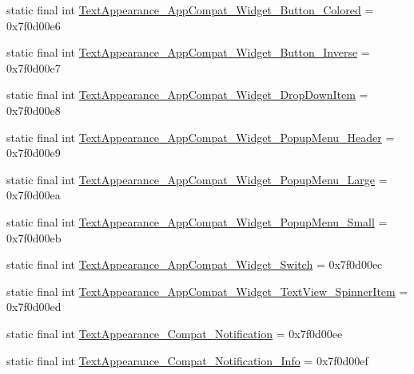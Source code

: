 \begin{DoxyCompactItemize}
\item 
static final int \mbox{\hyperlink{classcom_1_1synnapps_1_1carouselview_1_1_r_1_1style_acfe36648cf7ea21cec908f643bfdeacb}{Text\+Appearance\+\_\+\+App\+Compat\+\_\+\+Widget\+\_\+\+Button\+\_\+\+Colored}} = 0x7f0d00e6
\item 
static final int \mbox{\hyperlink{classcom_1_1synnapps_1_1carouselview_1_1_r_1_1style_ade4705e633d2a9732bae7459c625e06c}{Text\+Appearance\+\_\+\+App\+Compat\+\_\+\+Widget\+\_\+\+Button\+\_\+\+Inverse}} = 0x7f0d00e7
\item 
static final int \mbox{\hyperlink{classcom_1_1synnapps_1_1carouselview_1_1_r_1_1style_a25ecba49f37a4b5fc9a7170acc55ebff}{Text\+Appearance\+\_\+\+App\+Compat\+\_\+\+Widget\+\_\+\+Drop\+Down\+Item}} = 0x7f0d00e8
\item 
static final int \mbox{\hyperlink{classcom_1_1synnapps_1_1carouselview_1_1_r_1_1style_a74ef552da152bf0e4701b67322d65aa7}{Text\+Appearance\+\_\+\+App\+Compat\+\_\+\+Widget\+\_\+\+Popup\+Menu\+\_\+\+Header}} = 0x7f0d00e9
\item 
static final int \mbox{\hyperlink{classcom_1_1synnapps_1_1carouselview_1_1_r_1_1style_aaa323f414aac71ab5d3b9e0200a6930e}{Text\+Appearance\+\_\+\+App\+Compat\+\_\+\+Widget\+\_\+\+Popup\+Menu\+\_\+\+Large}} = 0x7f0d00ea
\item 
static final int \mbox{\hyperlink{classcom_1_1synnapps_1_1carouselview_1_1_r_1_1style_ab6cbaec05cbf04a4df4edc4cce1bc2fe}{Text\+Appearance\+\_\+\+App\+Compat\+\_\+\+Widget\+\_\+\+Popup\+Menu\+\_\+\+Small}} = 0x7f0d00eb
\item 
static final int \mbox{\hyperlink{classcom_1_1synnapps_1_1carouselview_1_1_r_1_1style_a41463c0771dab9df85994631eeeb91ed}{Text\+Appearance\+\_\+\+App\+Compat\+\_\+\+Widget\+\_\+\+Switch}} = 0x7f0d00ec
\item 
static final int \mbox{\hyperlink{classcom_1_1synnapps_1_1carouselview_1_1_r_1_1style_a947ba58ca78dbddb668314fe423282f2}{Text\+Appearance\+\_\+\+App\+Compat\+\_\+\+Widget\+\_\+\+Text\+View\+\_\+\+Spinner\+Item}} = 0x7f0d00ed
\item 
static final int \mbox{\hyperlink{classcom_1_1synnapps_1_1carouselview_1_1_r_1_1style_ac3f03d3b5b6b92cd2011c001a2be0910}{Text\+Appearance\+\_\+\+Compat\+\_\+\+Notification}} = 0x7f0d00ee
\item 
static final int \mbox{\hyperlink{classcom_1_1synnapps_1_1carouselview_1_1_r_1_1style_aa69d1c39f8c42dfa94b4b99e7991a0e1}{Text\+Appearance\+\_\+\+Compat\+\_\+\+Notification\+\_\+\+Info}} = 0x7f0d00ef
\item 

\end{DoxyCompactItemize}
